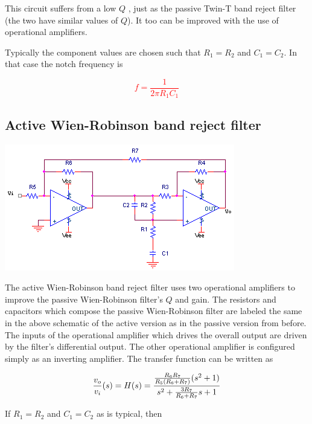 This circuit suffers from a low $Q$ \autocite[323]{op-amps-for-everyone}, just as the passive Twin-T band reject filter (the two have similar values of $Q$).
It too can be improved with the use of operational amplifiers.

Typically the component values are chosen such that $R_1 = R_2$ and $C_1 = C_2$.
In that case the notch frequency \autocite[324]{op-amps-for-everyone} is

\textcolor{red}{
\begin{equation}
f = \frac{1}{2\pi R_1 C_1}
\label{eq:passiveWienRobinson}
\end{equation}
}

\subsection{Active Wien-Robinson band reject filter}
\begin{center}
	\includegraphics{schematics/activeWien-Robinsonbandrejectfilter.PNG}
\end{center}
The active Wien-Robinson band reject filter uses two operational amplifiers to improve the passive Wien-Robinson filter's $Q$ and gain.
The resistors and capacitors which compose the passive Wien-Robinson filter are labeled the same in the above schematic of the active version as in the passive version from before.
The inputs of the operational amplifier which drives the overall output are driven by the filter's differential output.
The other operational amplifier is configured simply as an inverting amplifier.
The transfer function \autocite[323]{op-amps-for-everyone} can be written as

\textcolor{red}{
\begin{equation}
\frac{\vout}{\vin}(s) = \Hs = \frac{\frac{R_6 R_7}{R_5(R_6 + R_7)}(s^2 + 1)}{s^2 +\frac{3R_7}{R_6 + R_7}s+1}
\label{eq:activeWienRobinsonbandreject}
\end{equation}
}

If $R_1 = R_2$ and $C_1 = C_2$ as is typical, then

